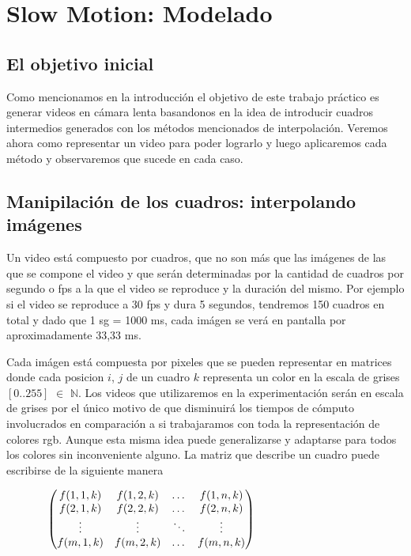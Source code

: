 \section{Slow Motion: Modelado}

\subsection{El objetivo inicial}

Como mencionamos en la introducción el objetivo de este trabajo práctico es generar videos en cámara lenta basandonos en la idea de introducir cuadros intermedios generados con los métodos mencionados de interpolación. Veremos ahora como representar un video para poder lograrlo y luego aplicaremos cada método y observaremos que sucede en cada caso.

\subsection{Manipilación de los cuadros: interpolando imágenes}

Un video está compuesto por cuadros, que no son más que las imágenes de las que se compone el video   y que serán determinadas por la cantidad de cuadros por segundo o fps a la que el video se reproduce y la duración del mismo.
Por ejemplo si el video se reproduce a 30 fps y dura 5 segundos, tendremos 150 cuadros en total y dado que 1 sg = 1000 ms, cada imágen se verá en pantalla por aproximadamente 33,33 ms.

Cada imágen está compuesta por pixeles que se pueden representar en matrices donde cada posicion $i$, $j$ de un cuadro $k$ representa un color en la escala de grises $[0..255]$ $\in$ $\mathbb{N}$. Los videos que utilizaremos en la experimentación serán en escala de grises por el único motivo de que disminuirá los tiempos de cómputo involucrados en comparación a si trabajaramos con toda la representación de colores rgb. Aunque esta misma idea puede generalizarse y adaptarse para todos los colores sin inconveniente alguno.
La matriz que describe un cuadro puede escribirse de la siguiente manera

\vspace{4mm}

$
\hspace{1.3cm}
     \begin{pmatrix}
      f(1, 1, k) & f(1, 2, k) & \dots & f(1, n, k) \\
	  f(2, 1, k) & f(2, 2, k) & \dots & f(2, n, k) \\
	  \vdots & \vdots & \ddots & \vdots \\
	  f(m, 1, k) & f(m, 2, k) & \dots & f(m, n, k) \\
     \end{pmatrix}
$

